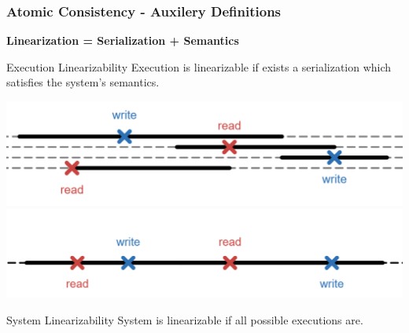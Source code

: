 \begin{frame}
    \frametitle{Atomic Consistency - Auxilery Definitions}
    \textbf{Linearization = Serialization + Semantics}
    \pause
    \begin{alertblock}{Execution Linearizability}
        Execution is linearizable if exists a serialization which satisfies the system's semantics.
    \end{alertblock}
    \pause
    \begin{center}
        \includegraphics[scale=.35]{resources/linearization_x_1.png}
        \pause
        \includegraphics[scale=.35]{resources/linearization_x_2.png}
    \end{center}
    \pause
    \begin{block}{System Linearizability}
        System is linearizable if all possible executions are.
    \end{block}
\end{frame}
